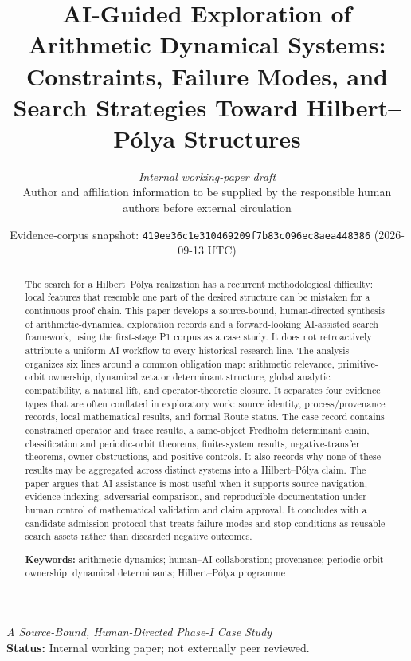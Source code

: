 \documentclass[11pt,a4paper]{article}
\title{\textbf{AI-Guided Exploration of Arithmetic Dynamical Systems:}\\[0.40em]
  \large Constraints, Failure Modes, and Search Strategies Toward Hilbert--Pólya Structures}
\author{\textit{Internal working-paper draft}\\[-0.20em]
  \small Author and affiliation information to be supplied by the responsible human authors before external circulation}
\date{\footnotesize Evidence-corpus snapshot: \texttt{419ee36c1e310469209f7b83c096ec8aea448386} (2026-09-13 UTC)}
\begin{document}
\maketitle
\thispagestyle{plain}

\begin{center}
  \textit{A Source-Bound, Human-Directed Phase-I Case Study}\\[0.55em]
  \small\textbf{Status:} Internal working paper; not externally peer reviewed.
\end{center}

\begin{center}
\end{center}

\begin{abstract}
The search for a Hilbert--Pólya realization has a recurrent methodological difficulty: local features that resemble one part of the desired structure can be mistaken for a continuous proof chain. This paper develops a source-bound, human-directed synthesis of arithmetic-dynamical exploration records and a forward-looking AI-assisted search framework, using the first-stage P1 corpus as a case study. It does not retroactively attribute a uniform AI workflow to every historical research line. The analysis organizes six lines around a common obligation map: arithmetic relevance, primitive-orbit ownership, dynamical zeta or determinant structure, global analytic compatibility, a natural lift, and operator-theoretic closure. It separates four evidence types that are often conflated in exploratory work: source identity, process/provenance records, local mathematical results, and formal Route status. The case record contains constrained operator and trace results, a same-object Fredholm determinant chain, classification and periodic-orbit theorems, finite-system results, negative-transfer theorems, owner obstructions, and positive controls. It also records why none of these results may be aggregated across distinct systems into a Hilbert--Pólya claim. The paper argues that AI assistance is most useful when it supports source navigation, evidence indexing, adversarial comparison, and reproducible documentation under human control of mathematical validation and claim approval. It concludes with a candidate-admission protocol that treats failure modes and stop conditions as reusable search assets rather than discarded negative outcomes.

\smallskip
\noindent\textbf{Keywords:} arithmetic dynamics; human--AI collaboration; provenance; periodic-orbit ownership; dynamical determinants; Hilbert--Pólya programme
\end{abstract}
\end{document}
